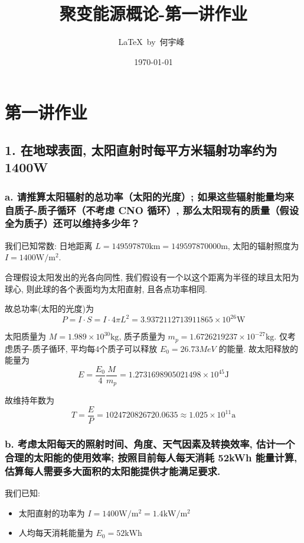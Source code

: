 \documentclass{article}
\title{聚变能源概论-第一讲作业}
\author{\LaTeX\ by\ 何宇峰\ }
\date{\today}
\begin{document}
\pagestyle{fancy}

\fancyhead[R]{\today}

\section*{第一讲作业}

\subsection*{1. 在地球表面, 太阳直射时每平方米辐射功率约为1400W}

\subsubsection*{a. 请推算太阳辐射的总功率（太阳的光度）; 如果这些辐射能量均来自质子-质子循环（不考虑 CNO 循环）, 那么太阳现有的质量（假设全为质子）还可以维持多少年？}

我们已知常数: 日地距离 $L=149597870\text{km} = 149597870000\text{m}$, 太阳的辐射照度为 $I=1400\text{W}/\text{m}^2$.

合理假设太阳发出的光各向同性, 我们假设有一个以这个距离为半径的球且太阳为球心, 则此球的各个表面均为太阳直射, 且各点功率相同. 

故总功率(太阳的光度)为
$$P = I \cdot S = I \cdot 4 \pi L^2 = 3.9372112713911865 \times 10^{26} \text{W}$$

太阳质量为 $M=1.989 \times 10^{30} \text{kg}$, 质子质量为 $m_p=1.6726219237\times 10^{-27} \text{kg}$. 仅考虑质子-质子循环, 平均每4个质子可以释放 $E_0 = 26.73 MeV$ 的能量. 故太阳释放的能量为
$$E = \frac{E_0}{4} \frac{M}{m_p} = 1.2731698905021498 \times {10}^{45} \text{J}$$

故维持年数为
$$T = \frac{E}{P} = 1024720826720.0635 \approx 1.025 \times {10}^{11} \text{a}$$

\subsubsection*{b. 考虑太阳每天的照射时间、角度、天气因素及转换效率, 估计一个合理的太阳能的使用效率; 按照目前每人每天消耗 52kWh 能量计算, 估算每人需要多大面积的太阳能提供才能满足要求. }

我们已知:
\begin{itemize}
    \item 太阳直射的功率为 $I = 1400\text{W}/\text{m}^2 = 1.4 \text{kW} / \text{m}^2$
    \item 人均每天消耗能量为 $E_0 = 52\text{kWh}$
\end{itemize}
\end{document}
